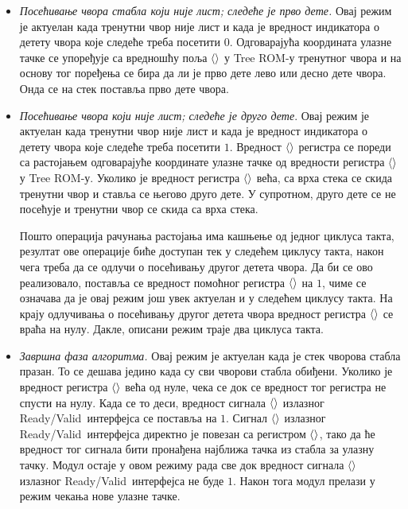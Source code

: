 \documentclass[master]{finthesis}
\newcommand*{\correctmath}[1]{%
    \ifcsname mathCorrectionFor#1\endcsname%
        \csname mathCorrectionFor#1\endcsname%
    \else%
        #1%
    \fi%
}
\newcommand*{\mfield}[1]{{\langle\correctmath{#1}\/\rangle}}
\newcommand*{\field}[1]{\texorpdfstring{$\mfield{#1}$}{⟨#1⟩}}
\newcommand{\rv}{Ready\slash Valid}
\begin{document}
\begin{itemize}
    \item \emph{Посећивање чвора стабла који није лист; следеће је прво дете.} Овај режим је актуелан када тренутни чвор није лист и када је вредност индикатора о детету чвора које следеће треба посетити $0$. Одговарајућа координата улазне тачке се упоређује са вредношћу поља \field{value} у Tree ROM-у тренутног чвора и на основу тог поређења се бира да ли је прво дете лево или десно дете чвора. Онда се на стек поставља прво дете чвора.

    \item \emph{Посећивање чвора који није лист; следеће је друго дете}. Овај режим је актуелан када тренутни чвор није лист и када је вредност индикатора о детету чвора које следеће треба посетити $1$. Вредност \field{closestPointDist} регистра се пореди са растојањем одговарајуће координате улазне тачке од вредности регистра \field{value} у Tree ROM-у. Уколико је вредност регистра \field{closestPointDist} већа, са врха стека се скида тренутни чвор и ставља се његово друго дете. У супротном, друго дете се не посећује и тренутни чвор се скида са врха стека.

    Пошто операција рачунања растојања има кашњење од једног циклуса такта, резултат ове операције биће доступан тек у следећем циклусу такта, након чега треба да се одлучи о посећивању другог детета чвора. Да би се ово реализовало, поставља се вредност помоћног регистра \field{calcMedianDist} на $1$, чиме се означава да је овај режим још увек актуелан и у следећем циклусу такта. На крају одлучивања о посећивању другог детета чвора вредност регистра \field{calcMedianDist} се враћа на нулу. Дакле, описани режим траје два циклуса такта.

    \item \emph{Завршна фаза алгоритма.} Овај режим је актуелан када је стек чворова стабла празан. То се дешава једино када су сви чворови стабла обиђени. Уколико је вредност регистра \field{closestPointDelay} већа од нуле, чека се док се вредност тог регистра не спусти на нулу. Када се то деси, вредност сигнала \field{valid} излазног \rv\ интерфејса се поставља на $1$. Сигнал \field{bits} излазног \rv\ интерфејса директно је повезан са регистром \field{closestPoint}, тако да ће вредност тог сигнала бити пронађена најближа тачка из стабла за улазну тачку. Модул остаје у овом режиму рада све док вредност сигнала \field{ready} излазног \rv\ интерфејса не буде $1$. Након тога модул прелази у режим чекања нове улазне тачке.
\end{itemize}
\end{document}
